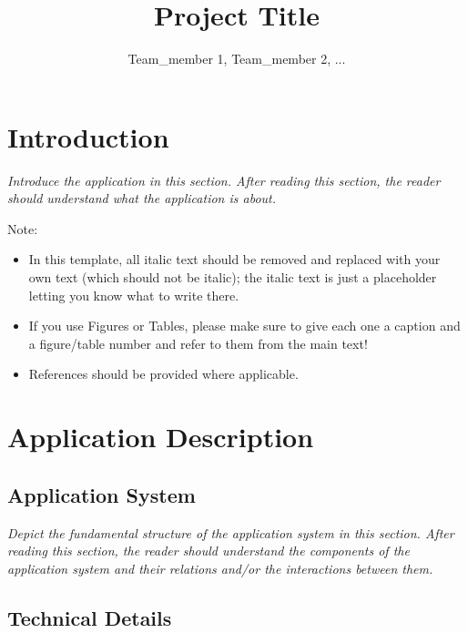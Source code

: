 \documentclass[11pt]{article}
\title{Project Title}
\author{Team\_member 1, Team\_member 2, ...}
\begin{document}
\maketitle  %

\section{Introduction}

{\it Introduce the application in this section. After reading this section, the reader should understand what the application is about.}

\noindent Note:
\begin{itemize}
  \item In this template, all italic text should be removed and replaced with your own text (which should not be italic); the italic text is just a placeholder letting you know what to write there.

  \item If you use Figures or Tables, please make sure to give each one a caption and a figure/table number and refer to them from the main text!

  \item References should be provided where applicable.

\end{itemize}

\section{Application Description}

\subsection{Application System}

{\it Depict the fundamental structure of the application system in this section. After reading this section, the reader should understand the components of the application system and their relations and/or the interactions between them. }

\subsection{Technical Details}
\end{document}
